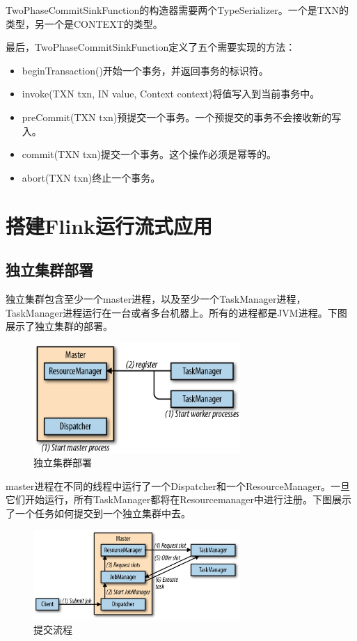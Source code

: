 \documentclass[cn,11pt,chinese]{elegantbook}
\begin{document}
TwoPhaseCommitSinkFunction的构造器需要两个TypeSerializer。一个是TXN的类型，另一个是CONTEXT的类型。

最后，TwoPhaseCommitSinkFunction定义了五个需要实现的方法：

\begin{itemize}
    \item beginTransaction()开始一个事务，并返回事务的标识符。
    \item invoke(TXN txn, IN value, Context context)将值写入到当前事务中。
    \item preCommit(TXN txn)预提交一个事务。一个预提交的事务不会接收新的写入。
    \item commit(TXN txn)提交一个事务。这个操作必须是幂等的。
    \item abort(TXN txn)终止一个事务。
\end{itemize}

\chapter{搭建Flink运行流式应用}

\section{独立集群部署}

独立集群包含至少一个master进程，以及至少一个TaskManager进程，TaskManager进程运行在一台或者多台机器上。所有的进程都是JVM进程。下图展示了独立集群的部署。

\begin{figure}[htbp]
    \centering
    \includegraphics[width=0.7\textwidth]{images/spaf_0901.png}
    \caption{独立集群部署}
\end{figure}

master进程在不同的线程中运行了一个Dispatcher和一个ResourceManager。一旦它们开始运行，所有TaskManager都将在Resourcemanager中进行注册。下图展示了一个任务如何提交到一个独立集群中去。

\begin{figure}[htbp]
    \centering
    \includegraphics[width=0.7\textwidth]{images/spaf_0902.png}
    \caption{提交流程}
\end{figure}
\end{document}
